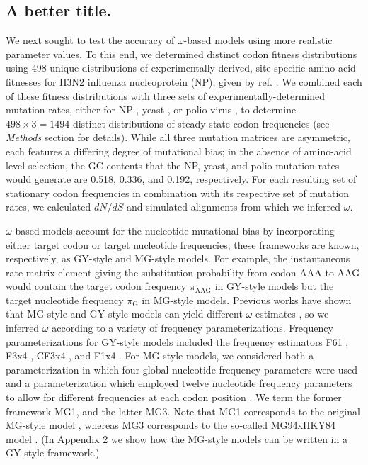 \documentclass[11pt]{article}
\begin{document}
\subsection*{A better title.}
We next sought to test the accuracy of $\omega$-based models using more realistic parameter values. To this end, we determined distinct codon fitness distributions using 498 unique distributions of experimentally-derived, site-specific amino acid fitnesses for H3N2 influenza nucleoprotein (NP), given by ref. \cite{Bloom2014a}. We combined each of these fitness distributions with three sets of experimentally-determined mutation rates, either for NP \cite{Bloom2014a}, yeast \cite{Zhu2014}, or polio virus \cite{Acevedo2014}, to determine $498 \times 3 = 1494$ distinct distributions of steady-state codon frequencies (see \emph{Methods} section for details). While all three mutation matrices are asymmetric, each features a differing degree of mutational bias; in the absence of amino-acid level selection, the GC contents that the NP, yeast, and polio mutation rates would generate are 0.518, 0.336, and 0.192, respectively. For each resulting set of stationary codon frequencies in combination with its respective set of mutation rates, we calculated $dN/dS$ and simulated alignments from which we inferred $\omega$.

$\omega$-based models account for the nucleotide mutational bias by incorporating either target codon \cite{GoldmanYang1994} or target nucleotide \cite{MuseGaut1994} frequencies; these frameworks are known, respectively, as GY-style and MG-style models. For example, the instantaneous rate matrix element giving the substitution probability from codon AAA to AAG would contain the target codon frequency $\pi_\text{AAG}$ in GY-style models but the target nucleotide frequency $\pi_\text{G}$ in MG-style models. Previous works have shown that MG-style and GY-style models can yield different $\omega$ estimates \cite{KosakovskyPondMuse2005,Yap2010}, so we inferred $\omega$ according to a variety of frequency parameterizations. Frequency parameterizations for GY-style models included the frequency estimators F61 \cite{GoldmanYang1994}, F3x4 \cite{GoldmanYang1994}, CF3x4 \cite{KosakovskyPond2010}, and F1x4 \cite{MuseGaut1994}. For MG-style models, we considered both a parameterization in which four global nucleotide frequency parameters were used \cite{MuseGaut1994} and a parameterization which employed twelve nucleotide frequency parameters to allow for different frequencies at each codon position \cite{KosakovskyPondMuse2005}. We term the former framework MG1, and the latter MG3. Note that MG1 corresponds to the original MG-style model \cite{MuseGaut1994}, whereas MG3 corresponds to the so-called MG94xHKY84 model \cite{KosakovskyPondMuse2005}. (In Appendix 2 we show how the MG-style models can be written in a GY-style framework.)
\end{document}

